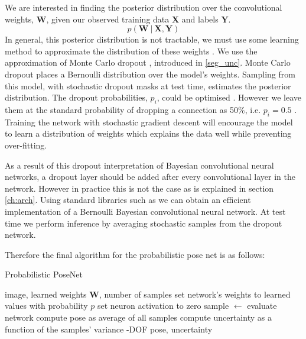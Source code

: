 We are interested in finding the posterior distribution over the convolutional weights, $\mathbf{W}$, given our observed training data $\mathbf{X}$ and labels $\mathbf{Y}$.
\begin{equation}
p(\mathbf{W}~|~\mathbf{X},\mathbf{Y})
\end{equation}
In general, this posterior distribution is not tractable, we must use some learning method to approximate the distribution of these weights \citep{denker1991transforming}. We use the approximation of Monte Carlo dropout \citep{Gal2015DropoutB}, introduced in \cref{seg_unc}.
Monte Carlo dropout places a Bernoulli distribution over the model's weights. Sampling from this model, with stochastic dropout masks at test time, estimates the posterior distribution. The dropout probabilities, $p_i$, could be optimised \citep{gal2017concrete}. However we leave them at the standard probability of dropping a connection as 50\%, i.e. $p_i=0.5$ \citep{srivastava2014dropout}.
Training the network with stochastic gradient descent will encourage the model to learn a distribution of weights which explains the data well while preventing over-fitting.

As a result of this dropout interpretation of Bayesian convolutional neural networks, a dropout layer should be added after every convolutional layer in the network. However in practice this is not the case as is explained in section \ref{ch:arch}. Using standard libraries such as \citep{jia2014caffe} we can obtain an efficient implementation of a Bernoulli Bayesian convolutional neural network. At test time we perform inference by averaging stochastic samples from the dropout network.

Therefore the final algorithm for the probabilistic pose net is as follows:

\begin{algorithm}
\caption{Probabilistic PoseNet}
\begin{algorithmic}[1]
\Require image, learned weights $\mathbf{W}$, number of samples
 \State set network's weights to learned values
  \State with probability $p$ set neuron activation to zero
 \EndFor
 \State sample $\leftarrow$ evaluate network
\EndFor
\State compute pose as average of all samples
\State compute uncertainty as a function of the samples' variance
-DOF pose, uncertainty
\end{algorithmic}
\end{algorithm}

